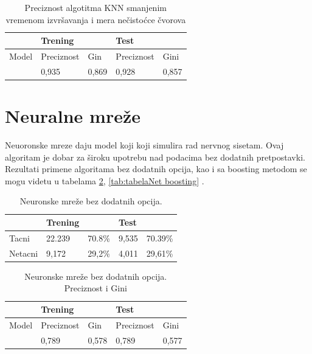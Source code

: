 \documentclass[a4paper]{article}
\begin{document}
\begin{table}[h!]
\begin{center}
\caption{Preciznost algotitma KNN smanjenim vremenom izvršavanja i mera nečistoćce čvorova}
\begin{tabular}{|l|l|l|l|l|} \hline
& Trening& & Test & \\ \hline
Model &Preciznost&Gin&Preciznost&Gini\\ \hline
&0,935 &0,869&0,928&0,857\\ \hline
\end{tabular}
\label{tab:tabelaKNNSpeed Preciznost}
\end{center}
\end{table}


\newpage
\section{Neuralne mreže}	
\label{sec:Neuronsle Mreze}

Neuoronske mreze daju model koji koji simulira rad nervnog sisetam. Ovaj algoritam je dobar za široku upotrebu nad podacima bez dodatnih pretpostavki. Rezultati primene algoritama bez dodatnih opcija, kao i sa boosting metodom se mogu videtu u tabelama \ref{tab:tabelaNET}, \ref{tab:tabelaNet boosting} .

\begin{table}[h!]
\begin{center}
\caption{Neuronske mreže bez dodatnih opcija.}
\begin{tabular}{|l|l|l|l|l|} \hline
& Trening& & Test & \\ \hline
Tacni &22.239 &70.8\% &9,535 &70.39\%\\ \hline
Netacni&9,172 &29,2\% &4,011 &29,61\%\\ \hline
\end{tabular}
\label{tab:tabelaNET}
\end{center}
\end{table}


\begin{table}[h!]
\begin{center}
\caption{Neuronske mreže bez dodatnih opcija. Preciznost i Gini}
\begin{tabular}{|l|l|l|l|l|} \hline
& Trening& & Test & \\ \hline
Model &Preciznost&Gin&Preciznost&Gini\\ \hline
&0,789 &0,578&0,789&0,577\\ \hline
\end{tabular}
\label{tab:tabelaNET Preciznost}
\end{center}
\end{table}
\end{document}
